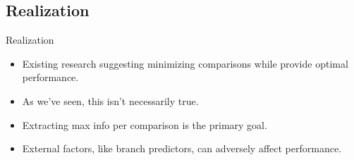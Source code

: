 \documentclass[13pt]{beamer}
\begin{document}
\subsection{Realization}
\begin{frame}{Realization}
	\begin{itemize}[<+->]
		\item Existing research suggesting minimizing comparisons while provide
		      optimal performance.
		\item As we've seen, this isn't necessarily true.
		\item Extracting max info per comparison is the primary goal.
		\item External factors, like branch predictors, can adversely affect
		      performance.
	\end{itemize}
\end{frame}
\end{document}
